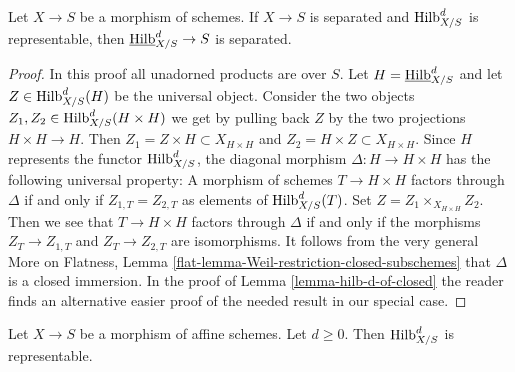 \begin{lemma}
\label{lemma-hilb-d-separated}
Let $X \to S$ be a morphism of schemes. If $X \to S$ is separated and
$\mathrm{Hilb}^d_{X/S}$ is representable,
then $\underline{\mathrm{Hilb}}^d_{X/S} \to S$ is separated.
\end{lemma}

\begin{proof}
In this proof all unadorned products are over $S$.
Let $H = \underline{\mathrm{Hilb}}^d_{X/S}$ and let
$Z \in \mathrm{Hilb}^d_{X/S}(H)$ be the universal object.
Consider the two objects $Z_1, Z_2 \in \mathrm{Hilb}^d_{X/S}(H \times H)$
we get by pulling back $Z$ by the two projections $H \times H \to H$.
Then $Z_1 = Z \times H \subset X_{H \times H}$ and $Z_2 = H \times Z
\subset X_{H \times H}$. Since $H$ represents the functor
$\mathrm{Hilb}^d_{X/S}$, the diagonal morphism $\Delta : H \to H \times H$
has the following universal property: A morphism of schemes
$T \to H \times H$ factors through $\Delta$ if and only if
$Z_{1, T} = Z_{2, T}$ as elements of $\mathrm{Hilb}^d_{X/S}(T)$.
Set $Z = Z_1 \times_{X_{H \times H}} Z_2$. Then we see that
$T \to H \times H$ factors through $\Delta$ if and only if
the morphisms $Z_T \to Z_{1, T}$ and $Z_T \to Z_{2, T}$ are
isomorphisms. It follows from the very general
More on Flatness, Lemma \ref{flat-lemma-Weil-restriction-closed-subschemes}
that $\Delta$ is a closed immersion. In the proof of
Lemma \ref{lemma-hilb-d-of-closed}
the reader finds an alternative easier proof of the needed result
in our special case.
\end{proof}

\begin{lemma}
\label{lemma-hilb-d-An}
Let $X \to S$ be a morphism of affine schemes. Let $d \geq 0$. Then
$\mathrm{Hilb}^d_{X/S}$ is representable.
\end{lemma}

